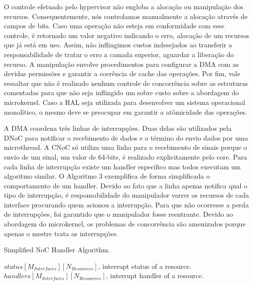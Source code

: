 		O controle efetuado pelo hypervisor não engloba a alocação ou manipulação dos recursos.
		Consequentemente, nós controlamos manualmente a alocação através de campos de bits.
		Caso uma operação não esteja em conformidade com esse controle, é retornado um valor negativo indicando o erro, \eg alocação de um recursos que já está em uso.
		Assim, não inflingimos custos indesejados ao transferir a responsabilidade de tratar o erro a camada superior, \eg aguardar a liberação do recurso.
		A manipulação envolve procedimentos para configurar a DMA com as devidas permissões e garantir a coerência de cache das operações.
		Por fim, vale ressaltar que não é realizado nenhum controle de concorrência sobre as estruturas comentadas para que não seja inflingido um sobre custo sobre a abordagem do microkernel.
		Caso a HAL seja utilizada para desenvolver um sistema operacional monolítico, o mesmo deve se preocupar em garantir a atômicidade das operações.

		A DMA coordena três linhas de interrupções.
		Duas delas são utilizados pela DNoC para notificar o recebimento de dados e o término do envio dados por uma microthread.
		A CNoC só utiliza uma linha para o recebimento de sinais porque o envio de um sinal, um valor de 64-bits, é realizado explicitamente pelo core.
		Para cada linha de interrupção existe um handler específico mas todos executam um algoritmo similar.
		O Algoritmo 3 exemplifica de forma simplificada o comportamento de um handler.
		Devido ao fato que a linha apenas notifica qual o tipo de interrupção, é responsabilidade do manipulador varrer os recursos de cada interface procurando quem acionou a interrupção.
		Para que não ocorresse a perda de interrupções, foi garantido que o manipulador fosse reentrante.
		Devido ao abordagem do microkernel, os problemas de concorrência são amenizados porque apenas o mestre trata as interrupções.

		\begin{algorithm}
			\caption{Simplified NoC Handler Algorithm.}%
			\label{alg.noc-handler}%
			\begin{algorithmic}[1]
				\Require $status[M_{Interfaces}][N_{Resources}]$, interrupt status of a resource.
				\Require $handlers[M_{Interfaces}][N_{Resources}]$, interrupt handler of a resource.
						\EndIf
					\EndFor
				\EndFor
				\EndProcedure
			\end{algorithmic}%
		\end{algorithm}

